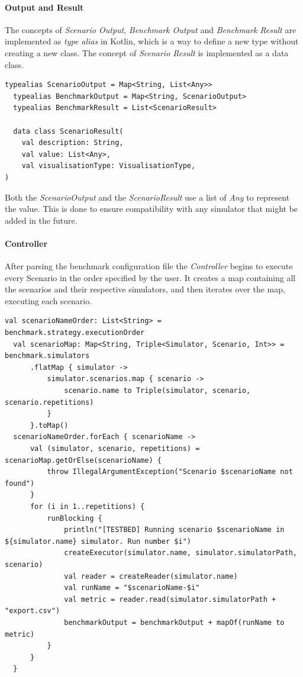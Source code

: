 \documentclass[12pt,a4paper,openright,twoside]{book}
\begin{document}
\paragraph*{Output and Result}

The concepts of \emph{Scenario Output}, \emph{Benchmark Output} and \emph{Benchmark Result} are implemented as \emph{type alias} in Kotlin, which is a way to define a new type without creating a new class.
The concept of \emph{Scenario Result} is implemented as a data class.

\begin{lstlisting}[style=my-kotlin, language=my-kotlin, caption={Benchmark output and result model}]
  typealias ScenarioOutput = Map<String, List<Any>>
  typealias BenchmarkOutput = Map<String, ScenarioOutput>
  typealias BenchmarkResult = List<ScenarioResult>

  data class ScenarioResult(
    val description: String,
    val value: List<Any>,
    val visualisationType: VisualisationType,
)
\end{lstlisting}

Both the \textit{ScenarioOutput} and the \textit{ScenarioResult} use a list of \emph{Any} to represent the value.
This is done to ensure compatibility with any simulator that might be added in the future.

\paragraph*{Controller}

After parsing the benchmark configuration file the \emph{Controller} begins to execute every Scenario in the order specified by the user.
It creates a map containing all the scenarios and their respective simulators, and then iterates over the map, executing each scenario.

\begin{lstlisting}[style=my-kotlin, language=my-kotlin, caption={Controller implementation}]
  val scenarioNameOrder: List<String> = benchmark.strategy.executionOrder
  val scenarioMap: Map<String, Triple<Simulator, Scenario, Int>> = benchmark.simulators
      .flatMap { simulator ->
          simulator.scenarios.map { scenario ->
              scenario.name to Triple(simulator, scenario, scenario.repetitions)
          }
      }.toMap()
  scenarioNameOrder.forEach { scenarioName ->
      val (simulator, scenario, repetitions) = scenarioMap.getOrElse(scenarioName) {
          throw IllegalArgumentException("Scenario $scenarioName not found")
      }
      for (i in 1..repetitions) {
          runBlocking {
              println("[TESTBED] Running scenario $scenarioName in ${simulator.name} simulator. Run number $i")
              createExecutor(simulator.name, simulator.simulatorPath, scenario)
              val reader = createReader(simulator.name)
              val runName = "$scenarioName-$i"
              val metric = reader.read(simulator.simulatorPath + "export.csv")
              benchmarkOutput = benchmarkOutput + mapOf(runName to metric)
          }
      }
  }
\end{lstlisting}
\end{document}
